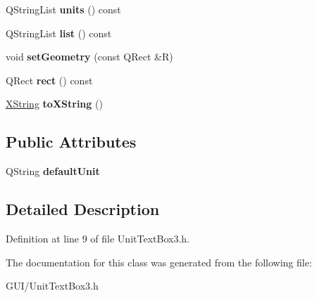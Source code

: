 \begin{DoxyCompactItemize}
Q\+String\+List {\bfseries units} () const
\item 
\mbox{\label{class_unit_text_box3_a60625012d1843f930c6a8ad651eb87d3}} 
Q\+String\+List {\bfseries list} () const
\item 
\mbox{\label{class_unit_text_box3_af07441bd15bdd903046cafdb4a310428}} 
void {\bfseries set\+Geometry} (const Q\+Rect \&R)
\item 
\mbox{\label{class_unit_text_box3_ad38b18dac7942215e90c165545816bc1}} 
Q\+Rect {\bfseries rect} () const
\item 
\mbox{\label{class_unit_text_box3_a83e1533d48dc2047c0f24ab919a3f435}} 
\hyperlink{class_x_string}{X\+String} {\bfseries to\+X\+String} ()
\end{DoxyCompactItemize}
\subsection*{Public Attributes}
\begin{DoxyCompactItemize}
\item 
\mbox{\label{class_unit_text_box3_a87b551ce56c1444378fc8a6503ff1a0b}} 
Q\+String {\bfseries default\+Unit}
\end{DoxyCompactItemize}


\subsection{Detailed Description}


Definition at line 9 of file Unit\+Text\+Box3.\+h.



The documentation for this class was generated from the following file\+:\begin{DoxyCompactItemize}
\item 
G\+U\+I/Unit\+Text\+Box3.\+h\end{DoxyCompactItemize}
